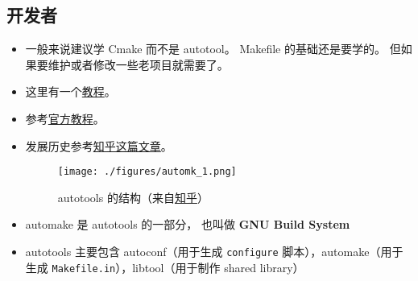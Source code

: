 \subsection{开发者}
\begin{itemize}
\item 一般来说建议学 Cmake 而不是 autotool。 Makefile 的基础还是要学的。 但如果要维护或者修改一些老项目就需要了。
\item 这里有一个\href{https://devmanual.gentoo.org/general-concepts/autotools/index.html}{教程}。
\item 参考\href{https://www.gnu.org/software/automake/manual/html_node/Autotools-Introduction.html}{官方教程}。
\item 发展历史参考\href{https://www.zhihu.com/question/22644913/answer/141475420}{知乎这篇文章}。
\begin{figure}[ht]
\centering
\texttt{[image: ./figures/automk\_1.png]}
\caption{autotools 的结构（来自\href{https://www.zhihu.com/question/22644913/answer/141475420}{知乎}）} \label{automk_fig1}
\end{figure}
\item automake 是 autotools 的一部分， 也叫做 \textbf{GNU Build System}
\item autotools 主要包含 autoconf（用于生成 \verb|configure| 脚本），automake（用于生成 \verb|Makefile.in|），libtool（用于制作 shared library）
\end{itemize}

